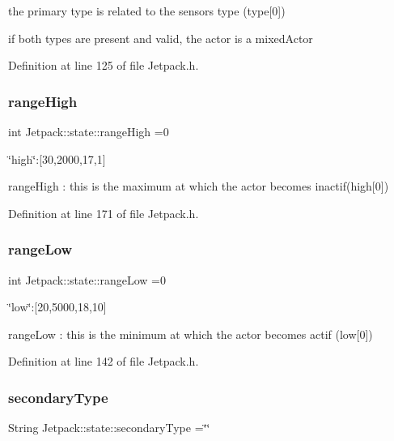 the primary type is related to the sensor\textquotesingle{}s type (type\mbox{[}0\mbox{]})

if both types are present and valid, the actor is a mixed\+Actor 

Definition at line 125 of file Jetpack.\+h.

\mbox{\label{struct_jetpack_1_1state_ae330612c3da637654ecfa89d36620b93}} 
\subsubsection{\texorpdfstring{range\+High}{rangeHigh}}
{\footnotesize\ttfamily int Jetpack\+::state\+::range\+High =0}

\char`\"{}high\char`\"{}\+:\mbox{[}30,2000,17,1\mbox{]}

range\+High \+: this is the maximum at which the actor becomes inactif(high\mbox{[}0\mbox{]}) 

Definition at line 171 of file Jetpack.\+h.

\mbox{\label{struct_jetpack_1_1state_ad0343b4fd5740c9c1b0876b27f84ace5}} 
\subsubsection{\texorpdfstring{range\+Low}{rangeLow}}
{\footnotesize\ttfamily int Jetpack\+::state\+::range\+Low =0}

\char`\"{}low\char`\"{}\+:\mbox{[}20,5000,18,10\mbox{]}

range\+Low \+: this is the minimum at which the actor becomes actif (low\mbox{[}0\mbox{]}) 

Definition at line 142 of file Jetpack.\+h.

\mbox{\label{struct_jetpack_1_1state_a81cf9af139da095b7d91e2a87e50135b}} 
\subsubsection{\texorpdfstring{secondary\+Type}{secondaryType}}
{\footnotesize\ttfamily String Jetpack\+::state\+::secondary\+Type =\char`\"{}\char`\"{}}

